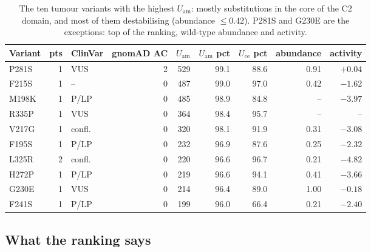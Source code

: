 \documentclass[11pt,a4paper]{article}
\newcommand{\Uam}{U_{\mathrm{am}}}
\newcommand{\Uce}{U_{\mathrm{ce}}}
\begin{document}
\begin{table}[H]
\centering\small
\begin{tabular}{@{}lrlrrrrrr@{}}
\toprule
Variant & pts & ClinVar & gnomAD AC & $\Uam$ & $\Uam$ pct & $\Uce$ pct & abundance & activity \\
\midrule
P281S & 1 & VUS & 2 & 529 & 99.1 & 88.6 & 0.91 & $+0.04$ \\
F215S & 1 & -- & 0 & 487 & 99.0 & 97.0 & 0.42 & $-1.62$ \\
M198K & 1 & P/LP & 0 & 485 & 98.9 & 84.8 & -- & $-3.97$ \\
R335P & 1 & VUS & 0 & 364 & 98.4 & 95.7 & -- & -- \\
V217G & 1 & confl. & 0 & 320 & 98.1 & 91.9 & 0.31 & $-3.08$ \\
F195S & 1 & P/LP & 0 & 232 & 96.9 & 87.6 & 0.25 & $-2.32$ \\
L325R & 2 & confl. & 0 & 220 & 96.6 & 96.7 & 0.21 & $-4.82$ \\
H272P & 1 & P/LP & 0 & 219 & 96.6 & 94.1 & 0.41 & $-3.66$ \\
G230E & 1 & VUS & 0 & 214 & 96.4 & 89.0 & 1.00 & $-0.18$ \\
F241S & 1 & P/LP & 0 & 199 & 96.0 & 66.4 & 0.21 & $-2.40$ \\
\bottomrule
\end{tabular}
\caption{The ten tumour variants with the highest $\Uam$: mostly
substitutions in the core of the C2 domain, and most of them destabilising
(abundance $\le 0.42$). P281S and G230E are the exceptions: top of the
ranking, wild-type abundance and activity.}
\label{tab:top}
\end{table}

\subsection{What the ranking says}
\end{document}
